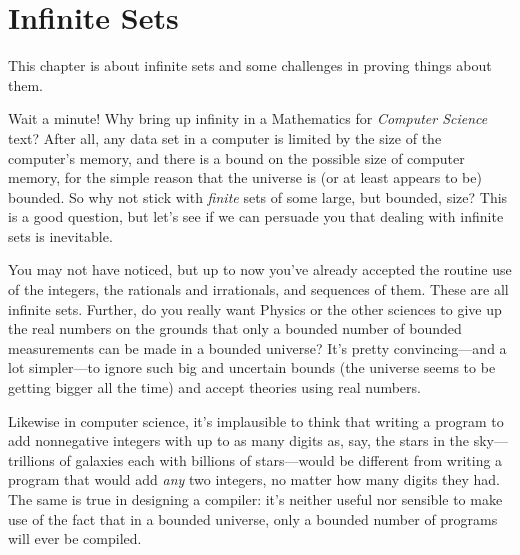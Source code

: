 \chapter{Infinite Sets}\label{infinite_chap}\label{set_theory_chap}

This chapter is about infinite sets%
%
and some challenges in proving things about them.

Wait a minute!  Why bring up infinity in a Mathematics for
\emph{Computer Science} text?  After all, any data set in a computer
is limited by the size of the computer's memory, and there is a bound
on the possible size of computer memory, for the simple reason that
the universe is (or at least appears to be) bounded.  So why not stick
with \emph{finite} sets of some large, but bounded, size?  This
is a good question, but let's see if we can persuade you that dealing
with infinite sets is inevitable.

\iffalse We've run into a lot of computer science students who wonder
why they should care about infinite sets.  They point out that
\fi

You may not have noticed, but up to now you've already accepted the
routine use of the integers, the rationals and irrationals, and
sequences of them.  These are all infinite sets.  Further, do you
really want Physics or the other sciences to give up the real numbers
on the grounds that only a bounded number of bounded measurements can
be made in a bounded universe?  It's pretty convincing---and a lot
simpler---to ignore such big and uncertain bounds (the universe seems
to be getting bigger all the time) and accept theories using real
numbers.

Likewise in computer science, it's implausible to think that writing a
program to add nonnegative integers with up to as many digits as, say,
the stars in the sky---trillions of galaxies each with billions of
stars---would be different from writing a program that would add
\emph{any} two integers, no matter how many digits they had.  The same
is true in designing a compiler: it's neither useful nor sensible to
make use of the fact that in a bounded universe, only a bounded number
of programs will ever be compiled.

